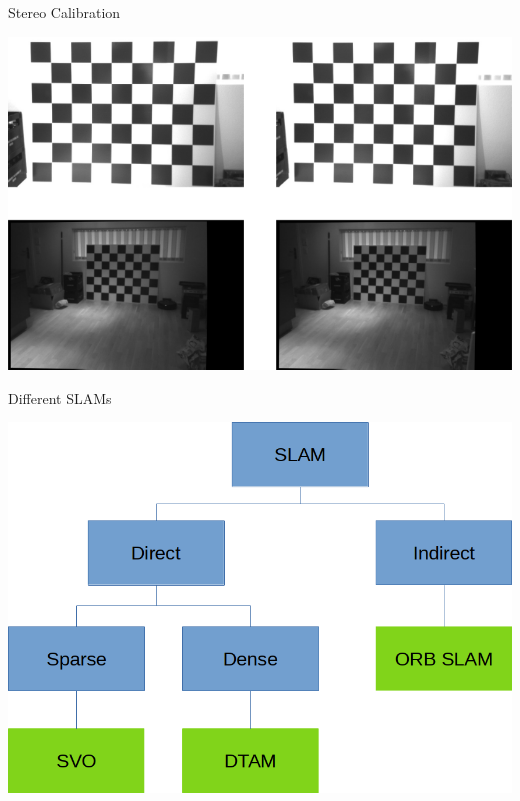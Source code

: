 \documentclass[aspectratio=169]{beamer}
\begin{document}
\begin{frame}{Stereo Calibration}
  \begin{center}
    \includegraphics[height=0.9\textheight]{./img/stereo_calib.png}
  \end{center}
\end{frame}

\note{
}

%

\begin{frame}{Different SLAMs}
  \begin{center}
    \includegraphics[height=0.9\textheight]{./img/slam_modes.png}
  \end{center}
\end{frame}
\end{document}
